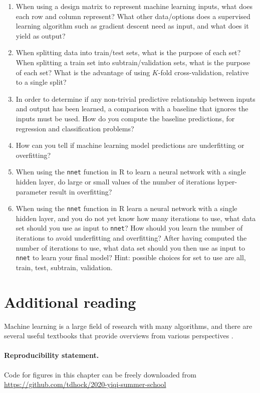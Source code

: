\documentclass[12pt]{article}
\begin{document}
\begin{enumerate}
\item When using a design matrix to represent machine learning inputs,
  what does each row and column represent? What other data/options
  does a supervised learning algorithm such as gradient descent need
  as input, and what does it yield as output?
\item When splitting data into train/test sets, what is the purpose of
  each set? When splitting a train set into subtrain/validation sets,
  what is the purpose of each set? What is the advantage of using
  $K$-fold cross-validation, relative to a single split?
\item In order to determine if any non-trivial predictive relationship
  between inputs and output has been learned, a comparison with a
  baseline that ignores the inputs must be used. How do you compute
  the baseline predictions, for regression and classification
  problems?
\item How can you tell if machine learning model predictions are
  underfitting or overfitting?
\item When using the \texttt{nnet} function in R to learn a
  neural network with a single hidden layer, do large or small values
  of the number of iterations hyper-parameter result in overfitting?
\item When using the \texttt{nnet} function in R learn a neural
  network with a single hidden layer, and you do not yet know how many
  iterations to use, what data set should you use as input to
  \texttt{nnet}? How should you learn the number of iterations to
  avoid underfitting and overfitting? After having computed the number
  of iterations to use, what data set should you then use as input to
  \texttt{nnet} to learn your final model? Hint: possible choices for
  set to use are all, train, test, subtrain, validation.
\end{enumerate}

\section{Additional reading}

Machine learning is a large field of research with many algorithms,
and there are several useful textbooks that provide overviews from
various perspectives \citep{Bishop2006, Hastie2009, Wasserman2010,
  Murphy2013, Goodfellow2016}.

\paragraph{Reproducibility statement.} Code for figures in this
chapter can be freely downloaded from
\url{https://github.com/tdhock/2020-yiqi-summer-school}


 
\end{document}
